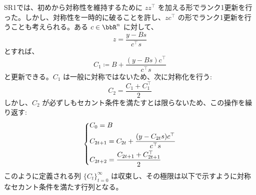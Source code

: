\documentclass[a4paper, 10pt, dvipdfmx,draft]{article}
\begin{document}
SR1では、初めから対称性を維持するために $z z^\top$ を加える形でランク1更新を行った。しかし、対称性を一時的に破ることを許し、$z c^\top$ の形でランク1更新を行うことも考えられる。ある $c \in \bbR^n$ に対して、
\begin{equation*}
    z = \frac{y - B s}{c^\top s}
\end{equation*}
とすれば、
\begin{equation*}
    C_1 \coloneqq B + \frac{(y - B s)c^\top}{c^\top s}
\end{equation*}
と更新できる。$C_1$ は一般に対称ではないため、次に対称化を行う:
\begin{equation*}
    C_2 = \frac{C_1 + C_1^\top}{2}
\end{equation*}
しかし、$C_2$ が必ずしもセカント条件を満たすとは限らないため、この操作を繰り返す:
\begin{equation*}
    \begin{dcases}
        C_0 = B                                                  \\
        C_{2t+1} = C_{2t} + \frac{(y - C_{2t}s)c^\top}{c^\top s} \\
        C_{2t+2} = \frac{C_{2t+1} + C_{2t+1}^\top}{2}
    \end{dcases}
\end{equation*}
このように定義される列 $\{ C_t \}_{t=0}^{\infty}$ は収束し、その極限は以下で示すように対称なセカント条件を満たす行列となる。
\end{document}
